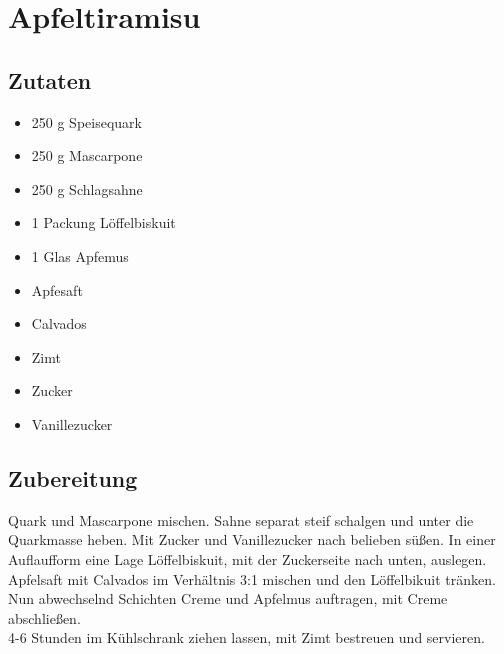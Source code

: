 \documentclass{article}
\begin{document}
\clearpage
\section{Apfeltiramisu} %
\label{sec:apfeltiramisu}
\subsection*{Zutaten} %
\label{sub:apfeltiramisu:zutaten}
	\begin{itemize}
		\item 250 g Speisequark
		\item 250 g Mascarpone
		\item 250 g Schlagsahne
    \item 1 Packung Löffelbiskuit
    \item 1 Glas Apfemus
    \item Apfesaft
    \item Calvados
    \item Zimt
    \item Zucker
    \item Vanillezucker
	\end{itemize}
  \subsection*{Zubereitung}
  \label{sub:apfeltiramisu:zubereitung}
  Quark und Mascarpone mischen. Sahne separat steif schalgen und
  unter die Quarkmasse heben. Mit Zucker und Vanillezucker nach
  belieben süßen.
  In einer Auflaufform eine Lage Löffelbiskuit,
  mit der Zuckerseite nach unten, auslegen.
  Apfelsaft mit Calvados im Verhältnis 3:1 mischen
  und den Löffelbikuit tränken.
  Nun abwechselnd Schichten Creme und Apfelmus auftragen,
  mit Creme abschließen.\\
  4-6 Stunden im Kühlschrank ziehen lassen,
  mit Zimt bestreuen und servieren.
\end{document}
